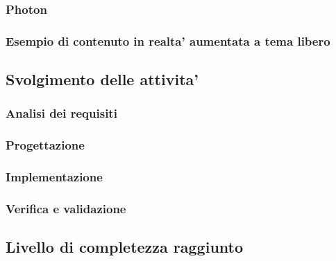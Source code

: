 \subsubsection{Photon}
\subsubsection{Esempio di contenuto in realta' aumentata a tema libero}

\subsection{Svolgimento delle attivita'}
\subsubsection{Analisi dei requisiti}
\subsubsection{Progettazione}
\subsubsection{Implementazione}
\subsubsection{Verifica e validazione}

\subsection{Livello di completezza raggiunto}